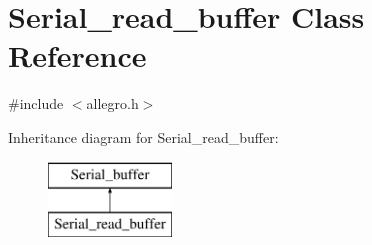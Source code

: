 \hypertarget{class_serial__read__buffer}{}\section{Serial\+\_\+read\+\_\+buffer Class Reference}
\label{class_serial__read__buffer}


{\ttfamily \#include $<$allegro.\+h$>$}

Inheritance diagram for Serial\+\_\+read\+\_\+buffer\+:\begin{figure}[H]
\begin{center}
\leavevmode
\includegraphics[height=2.000000cm]{class_serial__read__buffer}
\end{center}
\end{figure}
